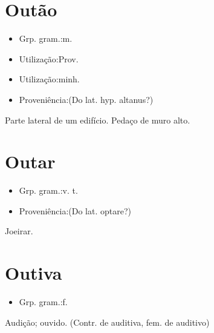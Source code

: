 \section{Outão}
\begin{itemize}
\item {Grp. gram.:m.}
\end{itemize}
\begin{itemize}
\item {Utilização:Prov.}
\end{itemize}
\begin{itemize}
\item {Utilização:minh.}
\end{itemize}
\begin{itemize}
\item {Proveniência:(Do lat. hyp. \textunderscore altanus\textunderscore ?)}
\end{itemize}
Parte lateral de um edifício.
Pedaço de muro alto.
\section{Outar}
\begin{itemize}
\item {Grp. gram.:v. t.}
\end{itemize}
\begin{itemize}
\item {Proveniência:(Do lat. \textunderscore optare\textunderscore ?)}
\end{itemize}
Joeirar.
\section{Outiva}
\begin{itemize}
\item {Grp. gram.:f.}
\end{itemize}
Audição; ouvido.
(Contr. de \textunderscore auditiva\textunderscore , fem. de \textunderscore auditivo\textunderscore )
